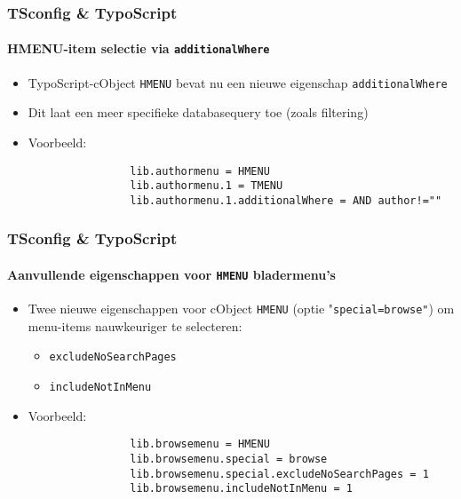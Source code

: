 \begin{frame}[fragile]
	\frametitle{TSconfig \& TypoScript}
	\framesubtitle{HMENU-item selectie via \texttt{additionalWhere}}

	\begin{itemize}

		\item TypoScript-cObject \texttt{HMENU} bevat nu een nieuwe eigenschap \texttt{additionalWhere}
		\item Dit laat een meer specifieke databasequery toe (zoals filtering)

		\item Voorbeeld:

			\begin{lstlisting}
				lib.authormenu = HMENU
				lib.authormenu.1 = TMENU
				lib.authormenu.1.additionalWhere = AND author!=""
			\end{lstlisting}

	\end{itemize}

\end{frame}


\begin{frame}[fragile]
	\frametitle{TSconfig \& TypoScript}
	\framesubtitle{Aanvullende eigenschappen voor \texttt{HMENU} bladermenu's}

	\begin{itemize}
		\item Twee nieuwe eigenschappen voor cObject \texttt{HMENU} (optie "\texttt{special=browse"})
			om menu-items nauwkeuriger te selecteren:
		
			\begin{itemize}
				\item \texttt{excludeNoSearchPages}
				\item \texttt{includeNotInMenu}
			\end{itemize}

		\item Voorbeeld:

			\begin{lstlisting}
				lib.browsemenu = HMENU
				lib.browsemenu.special = browse
				lib.browsemenu.special.excludeNoSearchPages = 1
				lib.browsemenu.includeNotInMenu = 1
			\end{lstlisting}

	\end{itemize}

\end{frame}

